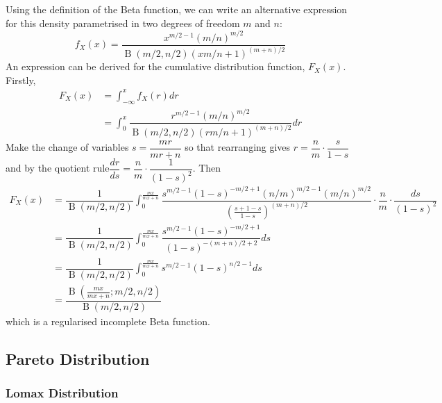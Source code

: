 \documentclass[11pt]{report} %
\begin{document}
Using the definition of the Beta function, we can write an alternative expression for this density parametrised in two degrees of freedom $m$ and $n$:
\begin{equation}
f_{X}\left(x\right) = \dfrac{x^{m/2 - 1}\left(m/n\right)^{m/2}}{\operatorname{B}\left(m/2, n/2\right)\left(xm/n + 1\right)^{\left(m + n\right)/2}}
\end{equation}
An expression can be derived for the cumulative distribution function, $F_{X}\left(x\right)$. Firstly,
\begin{align}
F_{X}\left(x\right) &= \int_{-\infty}^{x}f_{X}\left(r\right)dr \\
&= \int_{0}^{x}\dfrac{r^{m/2 - 1}\left(m/n\right)^{m/2}}{\operatorname{B}\left(m/2, n/2\right)\left(rm/n + 1\right)^{\left(m + n\right)/2}}dr
\end{align}
Make the change of variables $s = \dfrac{mr}{mr + n}$ so that rearranging gives $r = \dfrac{n}{m}\cdot\dfrac{s}{1 - s}$ and by the quotient rule$\dfrac{dr}{ds} = \dfrac{n}{m}\cdot\dfrac{1}{\left(1 - s\right)^{2}}$. Then
\begin{align}
F_{X}\left(x\right) &= \dfrac{1}{\operatorname{B}\left(m/2, n/2\right)}\int_{0}^{\frac{mx}{mx + n}}\dfrac{s^{m/2 - 1}\left(1 - s\right)^{-m/2 + 1}\left(n/m\right)^{m/2 - 1}\left(m/n\right)^{m/2}}{\left(\frac{s + 1 - s}{1 - s}\right)^{\left(m + n\right)/2}}\cdot\dfrac{n}{m}\cdot\dfrac{ds}{\left(1 - s\right)^{2}} \\
&= \dfrac{1}{\operatorname{B}\left(m/2, n/2\right)}\int_{0}^{\frac{mx}{mx + n}}\dfrac{s^{m/2 - 1}\left(1 - s\right)^{-m/2 + 1}}{\left(1 - s\right)^{-\left(m + n\right)/2 + 2}}ds \\
&= \dfrac{1}{\operatorname{B}\left(m/2, n/2\right)}\int_{0}^{\frac{mx}{mx + n}}s^{m/2 - 1}\left(1 - s\right)^{n/2 - 1}ds \\
&= \dfrac{\operatorname{B}\left(\frac{mx}{mx + n}; m/2, n/2\right)}{\operatorname{B}\left(m/2, n/2\right)}
\end{align}
which is a regularised incomplete Beta function.

\subsection{Pareto Distribution}

\subsubsection{Lomax Distribution}
\end{document}
